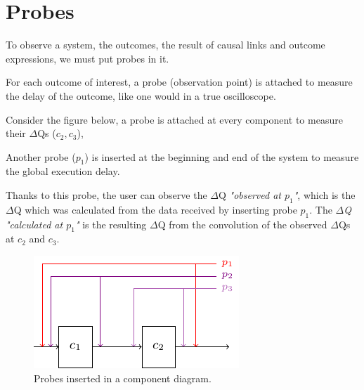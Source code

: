 \section{Probes}

To observe a system, the outcomes, the result of causal links and outcome expressions, we must put probes in it.

For each outcome of interest, a probe (observation point) is attached to measure the delay of the outcome, like one would in a true oscilloscope. 

Consider the figure below, a probe is attached at every component to measure their $\Delta$Qs ($c_2, c_3$), 

Another probe ($p_1$) is inserted at the beginning and end of the system to measure the global execution delay. 

Thanks to this probe, the user can observe the $\Delta$Q \textit{"observed at $p_1$"}, which is the $\Delta$Q which was calculated from the data received by inserting probe $p_1$. The \textit{$\Delta$Q "calculated at $p_1$"} is the resulting $\Delta$Q from the convolution of the observed $\Delta$Qs at $c_2$ and $c_3$.   
    \begin{figure}[H]
        \begin{center}
            \includegraphics[scale=1.8]{tikz/probes.pdf}
        \end{center}
        \label{fig:probes}
        \caption{Probes inserted in a component diagram.}
    \end{figure}



